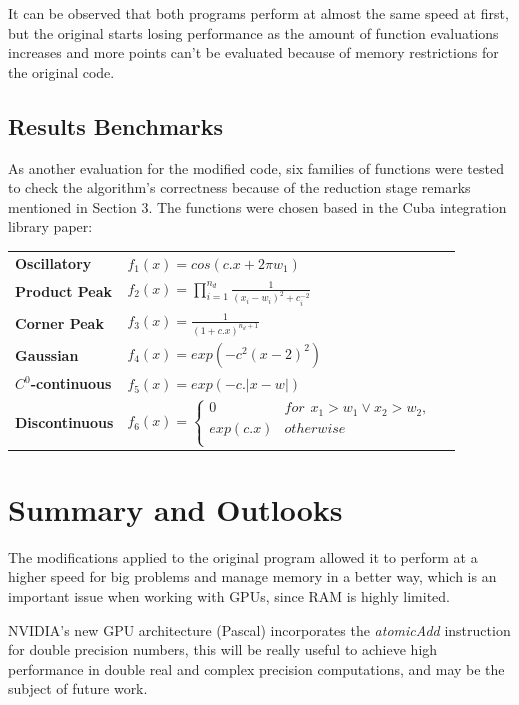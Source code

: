 \documentclass[english]{maciarticle}
\begin{document}
It can be observed that both programs perform at almost the same speed at first, but the original starts losing performance as the amount of function evaluations increases and more points can't be evaluated because of memory restrictions for the original code.

\subsection*{Results Benchmarks}
As another evaluation for the modified code, six families of functions were tested to check the algorithm's correctness because of the reduction stage remarks mentioned in Section 3. The functions were chosen based in the Cuba integration library paper\cite{hahncuba}:

\begin{center}
	\begin{tabular}{lll}
		\textbf{Oscillatory} & $f_1(x) = cos(c.x+2 \pi w_1)$ \\
		\textbf{Product Peak} & $f_2(x) = \prod_{i = 1}^{n_d} \frac{1}{(x_i - w_i)^2 + c_i ^{-2}}$ \\
		\textbf{Corner Peak} & $f_3(x) = \frac{1}{(1+c.x)^{n_d+1}}$\\
		\textbf{Gaussian} & $f_4(x) = exp(-c^2(x-2)^2)$\\
		\textbf{$C^0$-continuous} & $f_5(x) = exp(-c.|x-w|)$\\
		\textbf{Discontinuous} & $ f_6(x) =
		\begin{cases} 
		0 & for \hspace{5pt} x_1 > w_1 \vee x_2 > w_2, \\
		exp(c.x) & otherwise \\
		\end{cases}$
	\end{tabular}
\end{center}


\section{Summary and Outlooks}
The modifications applied to the original program allowed it to perform at a higher speed for big problems and manage memory in a better way, which is an important issue when working with GPUs, since RAM is highly limited.

NVIDIA's new GPU architecture (Pascal) incorporates the \textit{atomicAdd} instruction for double precision numbers\cite{pascal}, this will be really useful to achieve high performance in double real and complex precision computations, and may be the subject of future work. 
\end{document}
